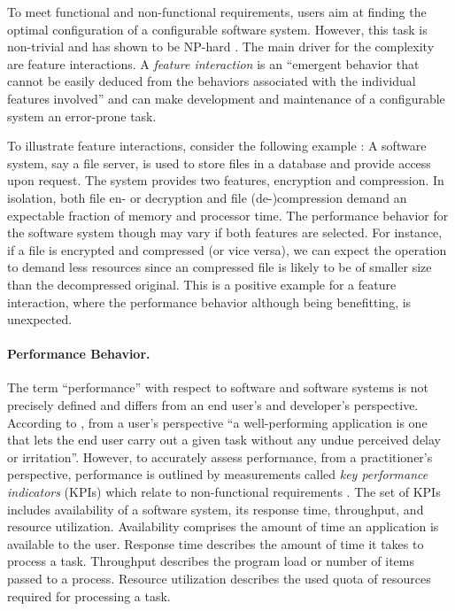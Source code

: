 To meet functional and non-functional requirements, users aim at finding the
optimal configuration of a configurable software system. However, this task is
non-trivial and has shown to be NP-hard \citep{white_selecting_2009}. The main
driver for the complexity are feature interactions. A \emph{feature
interaction} is an ``emergent behavior that cannot be easily deduced from the
behaviors associated with the individual features involved''
\citep{apel_feature-oriented_2013} and can make development and maintenance of
a configurable system an error-prone task.

To illustrate feature interactions, consider the following example
\citep{siegmund_performance-influence_2015}: A software system, say a file
server, is used to store files in a database and provide access upon request.
The system provides two features, encryption and compression. In
isolation, both file en- or decryption and file (de-)compression demand an
expectable fraction of memory and processor time. The performance behavior for
the software system though may vary if both features are selected. For
instance, if a file is encrypted and compressed (or vice versa), we can expect
the operation to demand less resources since an compressed file is likely to be
of smaller size than the decompressed original.
This is a positive example for a feature interaction, where the performance
behavior although being benefitting, is unexpected.

\paragraph{Performance Behavior.}
The term ``performance'' with respect to software and software systems is not
precisely defined and differs from an end user's and developer’s perspective.
According to \cite{molyneaux_art_2014}, from a user’s perspective ``a well-performing
application is one that lets the end user carry out a given task without any
undue perceived delay or irritation''. However, to accurately assess
performance, from a practitioner’s perspective, performance is outlined by
measurements called \emph{key performance indicators} (KPIs) which relate to
non-functional requirements \citep{molyneaux_art_2014}. The set of KPIs includes
availability of a software system, its response time, throughput, and resource
utilization. Availability comprises the amount of time an application is
available to the user. Response time describes the amount of time it takes to
process a task. Throughput describes the program load or number of items passed
to a process. Resource utilization describes the used quota of resources
required for processing a task.

